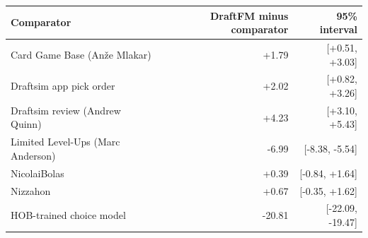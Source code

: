 \begin{tabular}{lrr}
\toprule
Comparator & DraftFM minus comparator & 95\% interval \\
\midrule
Card Game Base (Anže Mlakar) & +1.79 & [+0.51, +3.03] \\
Draftsim app pick order & +2.02 & [+0.82, +3.26] \\
Draftsim review (Andrew Quinn) & +4.23 & [+3.10, +5.43] \\
Limited Level-Ups (Marc Anderson) & -6.99 & [-8.38, -5.54] \\
NicolaiBolas & +0.39 & [-0.84, +1.64] \\
Nizzahon & +0.67 & [-0.35, +1.62] \\
HOB-trained choice model & -20.81 & [-22.09, -19.47] \\
\bottomrule
\end{tabular}

